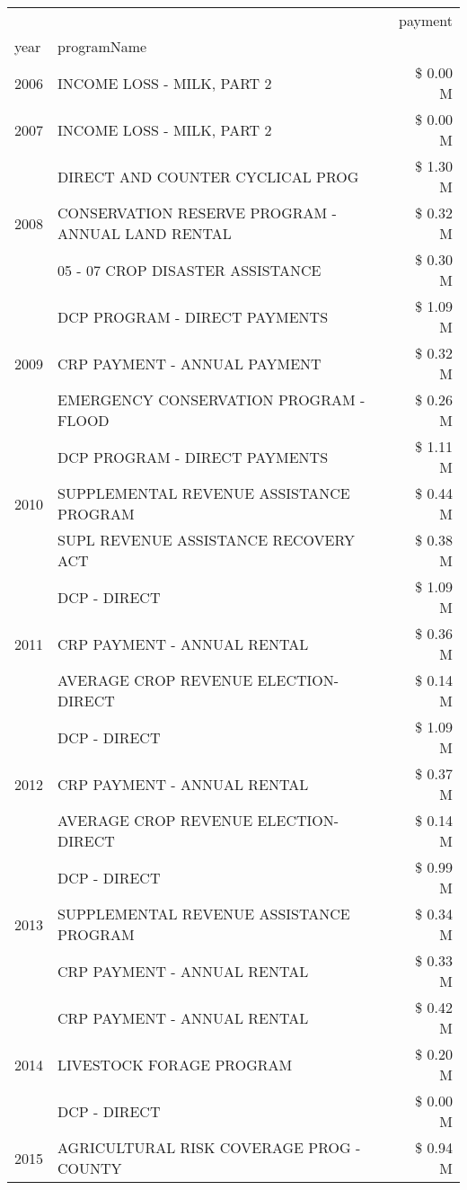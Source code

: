 \begin{tabular}{llr}
\toprule
 &  & payment \\
year & programName &  \\
\midrule
2006 & INCOME LOSS - MILK, PART 2 & \$ 0.00 M \\
\cline{1-3}
2007 & INCOME LOSS - MILK, PART 2 & \$ 0.00 M \\
\cline{1-3}
\multirow[t]{3}{*}{2008} & DIRECT AND COUNTER CYCLICAL PROG & \$ 1.30 M \\
 & CONSERVATION RESERVE PROGRAM - ANNUAL LAND RENTAL & \$ 0.32 M \\
 & 05 - 07 CROP DISASTER ASSISTANCE & \$ 0.30 M \\
\cline{1-3}
\multirow[t]{3}{*}{2009} & DCP PROGRAM - DIRECT PAYMENTS & \$ 1.09 M \\
 & CRP PAYMENT - ANNUAL PAYMENT & \$ 0.32 M \\
 & EMERGENCY CONSERVATION PROGRAM - FLOOD & \$ 0.26 M \\
\cline{1-3}
\multirow[t]{3}{*}{2010} & DCP PROGRAM - DIRECT PAYMENTS & \$ 1.11 M \\
 & SUPPLEMENTAL REVENUE ASSISTANCE PROGRAM & \$ 0.44 M \\
 & SUPL REVENUE ASSISTANCE RECOVERY ACT & \$ 0.38 M \\
\cline{1-3}
\multirow[t]{3}{*}{2011} & DCP - DIRECT & \$ 1.09 M \\
 & CRP PAYMENT - ANNUAL RENTAL & \$ 0.36 M \\
 & AVERAGE CROP REVENUE ELECTION-DIRECT & \$ 0.14 M \\
\cline{1-3}
\multirow[t]{3}{*}{2012} & DCP - DIRECT & \$ 1.09 M \\
 & CRP PAYMENT - ANNUAL RENTAL & \$ 0.37 M \\
 & AVERAGE CROP REVENUE ELECTION-DIRECT & \$ 0.14 M \\
\cline{1-3}
\multirow[t]{3}{*}{2013} & DCP - DIRECT & \$ 0.99 M \\
 & SUPPLEMENTAL REVENUE ASSISTANCE PROGRAM & \$ 0.34 M \\
 & CRP PAYMENT - ANNUAL RENTAL & \$ 0.33 M \\
\cline{1-3}
\multirow[t]{3}{*}{2014} & CRP PAYMENT - ANNUAL RENTAL & \$ 0.42 M \\
 & LIVESTOCK FORAGE PROGRAM & \$ 0.20 M \\
 & DCP - DIRECT & \$ 0.00 M \\
\cline{1-3}
\multirow[t]{3}{*}{2015} & AGRICULTURAL RISK COVERAGE PROG - COUNTY & \$ 0.94 M \\

\end{tabular}
